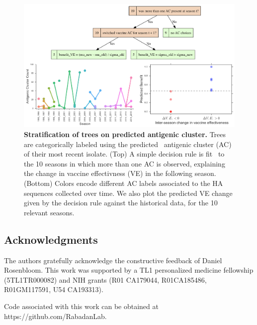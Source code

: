 \documentclass[a4paper,11pt]{article}
\begin{document}
\begin{figure}
    \centering
    \includegraphics[width=\linewidth]{../figures/influenza_antigenic.png}
    \caption{{\bf Stratification of trees on predicted antigenic cluster.} Trees are categorically labeled using the predicted~\cite{du2012mapping} antigenic cluster (AC) of their most recent isolate. (Top) A simple decision rule is fit~\cite{schmidt2009distilling} to the 10 seasons in which more than one AC is observed, explaining the change in vaccine effectivness (VE) in the following season. (Bottom) Colors encode different AC labels associated to the HA sequences collected over time. We also plot the predicted VE change given by the decision rule against the historical data, for the 10 relevant seasons.}
    \label{fig:flu_antigenic}
\end{figure}




\subsection*{Acknowledgments}

The authors gratefully acknowledge the constructive feedback of Daniel Rosenbloom.
This work was supported by a TL1 personalized medicine fellowship (5TL1TR000082) and NIH grants (R01 CA179044, R01CA185486, R01GM117591, U54 CA193313).

\vspace{0.25in}

Code associated with this work can be obtained at https://github.com/RabadanLab.




\end{document}
